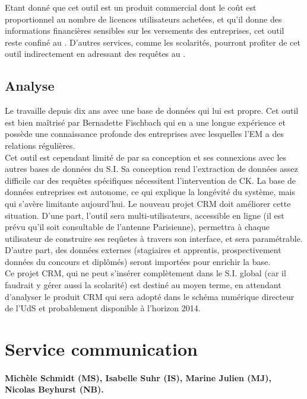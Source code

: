 \documentclass{book}
\begin{document}
Etant donné que cet outil est un produit commercial dont le coût est
proportionnel au nombre de licences utilisateurs achetées, et qu'il
donne des informations financières sensibles sur les versements des
entreprises, cet outil reste confiné au \sre. D'autres services, comme
les scolarités, pourront profiter de cet outil indirectement en adressant
des requêtes au \sre.

\subsection{Analyse}
Le \sre travaille depuis dix ans avec une base de données qui lui est
propre. Cet outil est bien maîtrisé par Bernadette Fischbach qui en
a une longue expérience et possède une connaissance profonde des 
entreprises avec lesquelles l'EM a des relations régulières. \\

Cet outil est cependant limité de par sa conception et ses connexions
avec les autres bases de données du S.I. Sa conception rend l'extraction
de données assez difficile car des requêtes spécifiques nécessitent 
l'intervention de CK. La base de données entreprises est autonome, ce
qui explique la longévité du système, mais qui s'avère limitante aujourd'hui.
Le nouveau projet CRM doit améliorer cette situation. D'une part, l'outil
sera multi-utilisateurs, accessible en ligne (il est prévu qu'il soit consultable
de l'antenne Parisienne), permettra à chaque utilisateur de construire ses
reqûetes à travers son interface, et sera paramétrable. D'autre part, 
des données externes (stagiaires et apprentis, prospectivement données du
concours et diplômés) seront importées pour enrichir la base.\\

Ce projet CRM, qui ne peut s'insérer complètement dans le S.I. global
(car il faudrait y gérer aussi la scolarité) est destiné au moyen terme,
en attendant d'analyser le produit CRM qui sera adopté dans le schéma
numérique directeur de l'UdS et probablement disponible à l'horizon 2014. 

  

\section{Service communication}

\paragraph{Michèle Schmidt (MS), Isabelle Suhr (IS), Marine Julien (MJ), 
Nicolas Beyhurst (NB).}
\end{document}
